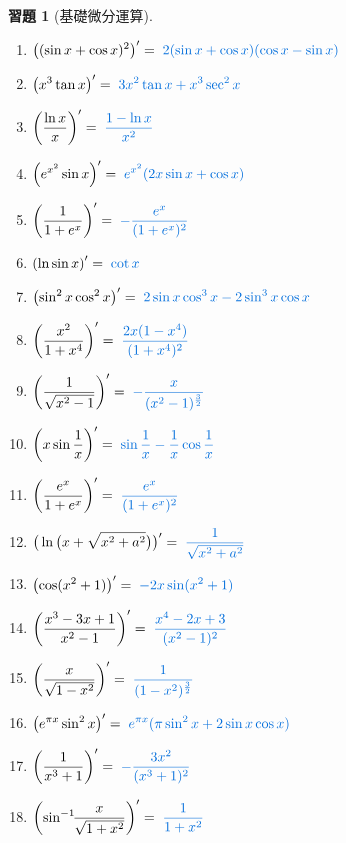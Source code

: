\documentclass[12pt]{extarticle}
\newcommand{\ds}{\displaystyle}
\theoremstyle{definition}
\newtheorem*{exe}{習題}
\begin{document}
\begin{exe}[基礎微分運算]
\begin{multicols}{2}
\begin{enumerate}
      \item $\ds\left((\sin x + \cos x)^2\right)' = {\color{C2}\;2(\sin x + \cos x)(\cos x - \sin x)}$
      \item $\ds\left(x^3\tan x\right)' = {\color{C2}\;3x^2 \tan x + x^3 \sec^2x}$
      \item $\ds\left(\frac{\ln x}{x}\right)' = {\color{C2}\;\frac{1 - \ln x}{x^2}}$
      \item $\ds\left(e^{x^2} \sin x\right)' = {\color{C2}\;e^{x^2}(2x\sin x + \cos x)}$
      \item $\ds\left(\frac{1}{1 + e^x}\right)' = {\color{C2}\;-\frac{e^x}{(1 + e^x)^2}}$
      \item $\ds\left(\ln\sin x\right)' = {\color{C2}\;\cot x}$
      \item $\ds\left(\sin^2x \cos^2x\right)' = {\color{C2}\;2\sin x\cos^3x - 2\sin^3x\cos x}$
      \item $\ds\left(\frac{x^2}{1 + x^4}\right)' = {\color{C2}\;\frac{2x(1 - x^4)}{(1 + x^4)^2}}$
      \item $\ds\left(\frac{1}{\sqrt{x^2 - 1}}\right)' = {\color{C2}\;-\frac{x}{(x^2 - 1)^{\frac{3}{2}}}}$
      \item $\ds\left(x\sin\frac{1}{x}\right)' = {\color{C2}\;\sin\frac{1}{x} - \frac{1}{x}\cos\frac{1}{x}}$
      \item $\ds\left(\frac{e^x}{1 + e^x}\right)' = {\color{C2}\;\frac{e^x}{(1 + e^x)^2}}$
      \item $\ds\big(\ln\big(x + \sqrt{x^2 + a^2}\big)\big)' = {\color{C2}\;\frac{1}{\sqrt{x^2 + a^2}}}$
      \item $\ds\left(\cos(x^2 + 1)\right)' = {\color{C2}\;-2x\sin(x^2 + 1)}$
      \item $\ds\left(\frac{x^3 - 3x + 1}{x^2 - 1}\right)' = {\color{C2}\;\frac{x^4 - 2x + 3}{(x^2 - 1)^2}}$
      \item $\ds\bigg(\frac{x}{\sqrt{1 - x^2}}\bigg)' = {\color{C2}\;\frac{1}{(1 - x^2)^{\frac{3}{2}}}}$
      \item $\ds\left(e^{\pi x}\sin^2x\right)' = {\color{C2}\;e^{\pi x}(\pi\sin^2x + 2\sin x\cos x)}$
      \item $\ds\left(\frac{1}{x^3 + 1}\right)' = {\color{C2}\;-\frac{3x^2}{(x^3 + 1)^2}}$
      \item $\ds\left(\sin^{-1}\!\!\frac{x}{\sqrt{1 + x^2}}\right)' = {\color{C2}\;\frac{1}{1 + x^2}}$

\end{enumerate}
\end{multicols}
\end{exe}
\end{document}
